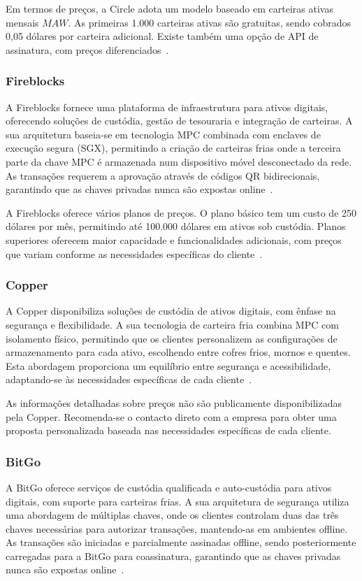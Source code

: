 Em termos de preços, a Circle adota um modelo baseado em carteiras ativas mensais \(MAW\). As primeiras 1.000 carteiras ativas são gratuitas, sendo cobrados 0,05 dólares por carteira adicional. Existe também uma opção de API de assinatura, com preços diferenciados~\cite{circlepricing2023}.

\subsubsection{Fireblocks}
A Fireblocks fornece uma plataforma de infraestrutura para ativos digitais, oferecendo soluções de custódia, gestão de tesouraria e integração de carteiras. A sua arquitetura baseia-se em tecnologia MPC combinada com enclaves de execução segura (SGX), permitindo a criação de carteiras frias onde a terceira parte da chave MPC é armazenada num dispositivo móvel desconectado da rede. As transações requerem a aprovação através de códigos QR bidirecionais, garantindo que as chaves privadas nunca são expostas online~\cite{fireblocks2023, fireblocksdocs2023}.

A Fireblocks oferece vários planos de preços. O plano básico tem um custo de 250 dólares por mês, permitindo até 100.000 dólares em ativos sob custódia. Planos superiores oferecem maior capacidade e funcionalidades adicionais, com preços que variam conforme as necessidades específicas do cliente~\cite{fireblockspricing2023}.

\subsubsection{Copper}
A Copper disponibiliza soluções de custódia de ativos digitais, com ênfase na segurança e flexibilidade. A sua tecnologia de carteira fria combina MPC com isolamento físico, permitindo que os clientes personalizem as configurações de armazenamento para cada ativo, escolhendo entre cofres frios, mornos e quentes. Esta abordagem proporciona um equilíbrio entre segurança e acessibilidade, adaptando-se às necessidades específicas de cada cliente~\cite{copper2023, coppercustody2023}.

As informações detalhadas sobre preços não são publicamente disponibilizadas pela Copper. Recomenda-se o contacto direto com a empresa para obter uma proposta personalizada baseada nas necessidades específicas de cada cliente.

\subsubsection{BitGo}
A BitGo oferece serviços de custódia qualificada e auto-custódia para ativos digitais, com suporte para carteiras frias. A sua arquitetura de segurança utiliza uma abordagem de múltiplas chaves, onde os clientes controlam duas das três chaves necessárias para autorizar transações, mantendo-as em ambientes offline. As transações são iniciadas e parcialmente assinadas offline, sendo posteriormente carregadas para a BitGo para coassinatura, garantindo que as chaves privadas nunca são expostas online~\cite{bitgo2023, bitgocold2023}.

